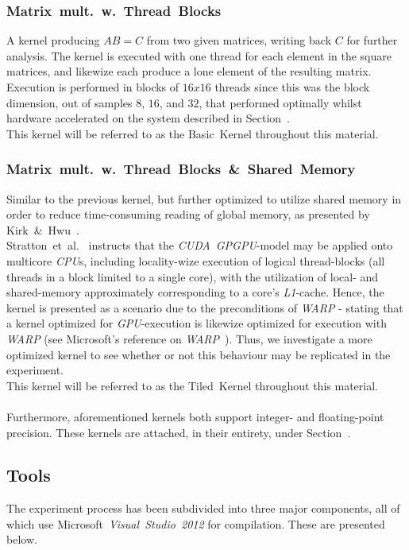 \documentclass[a4paper,twocolumn,10pt]{article}
\begin{document}
\subsubsection{Matrix~mult.~w.~Thread~Blocks}
A kernel producing $AB=C$ from two given matrices, writing back $C$ for further analysis. The kernel is executed with one thread for each element in the square matrices, and likewize each produce a lone element of the resulting matrix. Execution is performed in blocks of $16x16$ threads since this was the block dimension, out of samples $8$, $16$, and $32$, that performed optimally whilst hardware accelerated on the system described in Section~.\\
This kernel will be referred to as the Basic~Kernel throughout this material.

\subsubsection{Matrix~mult.~w.~Thread~Blocks~\&~Shared~Memory}
Similar to the previous kernel, but further optimized to utilize shared memory in order to reduce time-consuming reading of global memory, as presented by Kirk~\&~Hwu~\cite[p.~77-93]{Kirk:2010:PMP:1841511}.\\
Stratton~et~al.~\cite[p.~1-3]{Stratton:2008:MEI:1485701.1485703} instructs that the \textit{CUDA}~\textit{GPGPU}-model may be applied onto multicore \textit{CPU}s, including locality-wize execution of logical thread-blocks (all threads in a block limited to a single core), with the utilization of local- and shared-memory approximately corresponding to a core's \textit{L1}-cache. Hence, the kernel is presented as a scenario due to the preconditions of \textit{WARP} - stating that a kernel optimized for \textit{GPU}-execution is likewize optimized for execution with \textit{WARP} (see Microsoft's reference on \textit{WARP}~). Thus, we investigate a more optimized kernel to see whether or not this behaviour may be replicated in the experiment.\\
This kernel will be referred to as the Tiled~Kernel throughout this material.\\
\\
Furthermore, aforementioned kernels both support integer- and floating-point precision. These kernels are attached, in their entirety, under Section~.

\subsection{Tools}
\label{sec:contribution:tools}
The experiment process has been subdivided into three major components, all of which use Microsoft~\textit{Visual~Studio~2012} for compilation. These are presented below.
\end{document}
